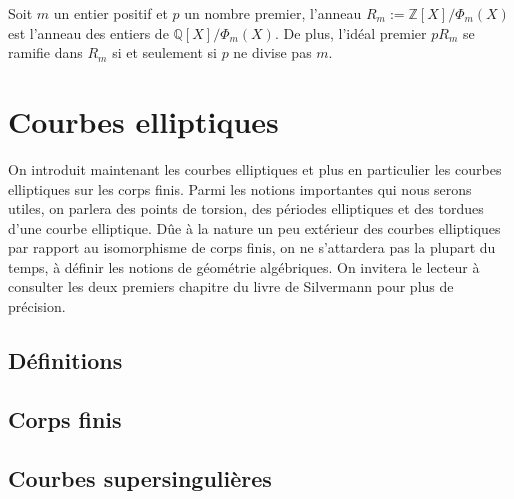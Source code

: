 \documentclass[a4paper]{article} %
\numberwithin{section}{part}
\numberwithin{equation}{section}
\newcommand\QQ{\mathbb{Q}}
\newcommand\ZZ{\mathbb{Z}}
\begin{document}
\begin{thm}
\label{th:entiercycl}
Soit $m$ un entier positif et $p$ un nombre premier, l'anneau $R_m := 
\ZZ[X]/\Phi_m(X)$ est l'anneau des entiers de $\QQ[X]/\Phi_m(X)$. De plus, 
l'idéal premier $pR_m$ se ramifie dans $R_m$ si et seulement si $p$ ne divise 
pas $m$.
\end{thm}
\section{Courbes elliptiques}
On introduit maintenant les courbes elliptiques et plus en particulier les
courbes elliptiques sur les corps finis. Parmi les notions importantes qui nous
serons utiles, on parlera des points de torsion, des périodes elliptiques et des
tordues d'une courbe elliptique. Dûe à la nature un peu extérieur des courbes
elliptiques par rapport au isomorphisme de corps finis, on ne s'attardera pas 
la plupart du temps, à définir les notions de géométrie algébriques. On invitera
le lecteur à consulter les deux premiers chapitre du livre de 
Silvermann\cite{Sil} pour plus de précision.

\subsection{Définitions}
\subsection{Corps finis}


\subsection{Courbes supersingulières}
\end{document}
